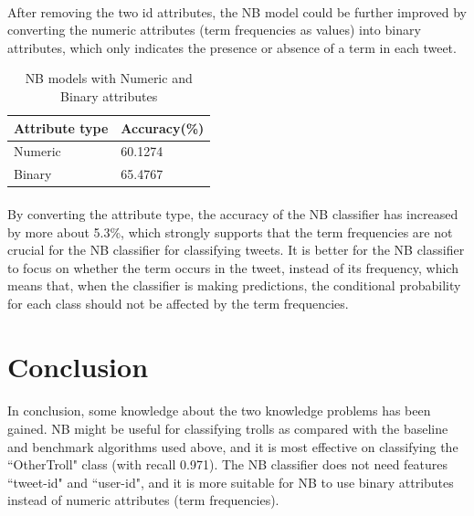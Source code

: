 \documentclass[11pt]{article}
\begin{document}
\paragraph{} After removing the two id attributes, the NB model could be further improved by converting the numeric attributes (term frequencies as values) into binary attributes, which only indicates the presence or absence of a term in each tweet.
\begin{table}[!htbp]
 \begin{center}
\begin{tabular}{| l | l |}
      \hline
      Attribute type & Accuracy(\%) \\
      \hline\hline
      Numeric & 60.1274 \\
      Binary & 65.4767 \\
      \hline
\end{tabular}
\caption{NB models with Numeric and Binary attributes}\label{table3}
 \end{center}
\end{table}

\paragraph{} By converting the attribute type, the accuracy of the NB classifier has increased by more about 5.3\%, which strongly supports that the term frequencies are not crucial for the NB classifier for classifying tweets. It is better for the NB classifier to focus on whether the term occurs in the tweet, instead of its frequency, which means that, when the classifier is making predictions, the conditional probability for each class should not be affected by the term frequencies.

\section{Conclusion}
\paragraph{} In conclusion, some knowledge about the two knowledge problems has been gained. NB might be useful for classifying trolls as compared with the baseline and benchmark algorithms used above, and it is most effective on classifying the ``OtherTroll" class (with recall 0.971). The NB classifier does not need features ``tweet-id" and ``user-id", and it is more suitable for NB to use binary attributes instead of numeric attributes (term frequencies).

\printbibliography
\end{document}
